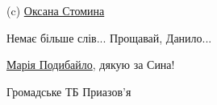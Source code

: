(c) \href{https://www.facebook.com/oksana.stomina}{Оксана Стомина}

Немає більше слів... Прощавай, Данило...

\href{https://www.facebook.com/profile.php?id=100001249282372}{Марія Подибайло}, дякую за Сина!



Громадське ТБ Приазов'я
